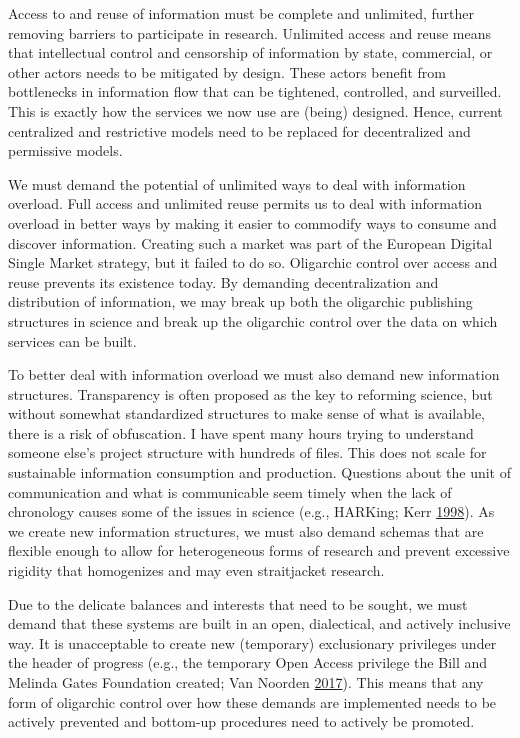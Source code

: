 \documentclass[a5paper]{book}
\begin{document}
Access to and reuse of information must be complete and unlimited,
further removing barriers to participate in research. Unlimited access
and reuse means that intellectual control and censorship of information
by state, commercial, or other actors needs to be mitigated by design.
These actors benefit from bottlenecks in information flow that can be
tightened, controlled, and surveilled. This is exactly how the services
we now use are (being) designed. Hence, current centralized and
restrictive models need to be replaced for decentralized and permissive
models.

We must demand the potential of unlimited ways to deal with information
overload. Full access and unlimited reuse permits us to deal with
information overload in better ways by making it easier to commodify
ways to consume and discover information. Creating such a market was
part of the European Digital Single Market strategy, but it failed to do
so. Oligarchic control over access and reuse prevents its existence
today. By demanding decentralization and distribution of information, we
may break up both the oligarchic publishing structures in science and
break up the oligarchic control over the data on which services can be
built.

To better deal with information overload we must also demand new
information structures. Transparency is often proposed as the key to
reforming science, but without somewhat standardized structures to make
sense of what is available, there is a risk of obfuscation. I have spent
many hours trying to understand someone else's project structure with
hundreds of files. This does not scale for sustainable information
consumption and production. Questions about the unit of communication
and what is communicable seem timely when the lack of chronology causes
some of the issues in science (e.g., HARKing; Kerr
\protect\hyperlink{ref-doi:10.1207ux2fs15327957pspr0203_4}{1998}). As we
create new information structures, we must also demand schemas that are
flexible enough to allow for heterogeneous forms of research and prevent
excessive rigidity that homogenizes and may even straitjacket research.

Due to the delicate balances and interests that need to be sought, we
must demand that these systems are built in an open, dialectical, and
actively inclusive way. It is unacceptable to create new (temporary)
exclusionary privileges under the header of progress (e.g., the
temporary Open Access privilege the Bill and Melinda Gates Foundation
created; Van Noorden
\protect\hyperlink{ref-doi:10.1038ux2fnature.2017.21486}{2017}). This
means that any form of oligarchic control over how these demands are
implemented needs to be actively prevented and bottom-up procedures need
to actively be promoted.
\end{document}
